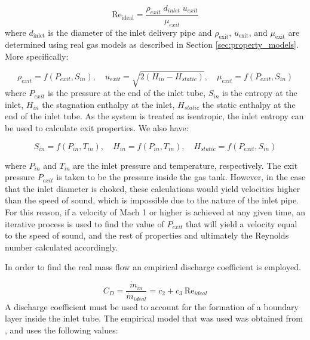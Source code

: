 \begin{equation}
\label{equ:reynoldsIdeal}
\text{Re}_{\text{ideal}} = \frac{\rho_{exit}\;d_{inlet}\;u_{exit}}{\mu_{exit}}
\end{equation}
where $d_{\text{inlet}}$ is the diameter of the inlet delivery pipe and  $\rho_{\text{exit}}$, $u_{\text{exit}}$, and $\mu_{\text{exit}}$ are determined using real gas models as described in Section \ref{sec:property_models}. More specifically:

\begin{equation}
\rho_{exit} =  f\left(P_{exit}, S_{in}\right), \quad u_{exit} = \sqrt{2\left(H_{in} - H_{static}\right)}, \quad\mu_{exit}= f\left(P_{exit}, S_{in}\right)
\end{equation}
where $P_{exit}$ is the pressure at the end of the inlet tube, $S_{in}$ is the entropy at the inlet, $H_{in}$ the stagnation enthalpy at the inlet, $H_{static}$ the static enthalpy at the end of the inlet tube. As the system is treated as isentropic, the inlet entropy can be used to calculate exit properties. We also have:

\begin{equation}
S_{in} = f\left( P_{in}, T_{in} \right), \quad H_{in} = f\left( P_{in}, T_{in} \right), \quad H_{static} = f\left( P_{exit}, S_{in} \right)
\end{equation}

\noindent where $P_{in}$ and $T_{in}$ are the inlet pressure and temperature, respectively. The exit pressure $P_{exit}$ is taken to be the pressure inside the gas tank. However, in the case that the inlet diameter is choked, these calculations would yield velocities higher than the speed of sound, which is impossible due to the nature of the inlet pipe. For this reason, if a velocity of Mach 1 or higher is achieved at any given time, an iterative process is used to find the value of $P_{exit}$ that will yield a velocity equal to the speed of sound, and the rest of properties and ultimately the Reynolds number calculated accordingly.

In order to find the real mass flow an empirical discharge coefficient is employed.

\begin{equation}
C_D = \frac{\dot{m}_{in}}{\dot{m}_{ideal}} = c_2+ c_3 \:\text{Re}_{ideal} 
\end{equation}
A discharge coefficient must be used to account for the formation of a boundary layer inside the inlet tube. The empirical model that was used was obtained from , and uses the following values:

